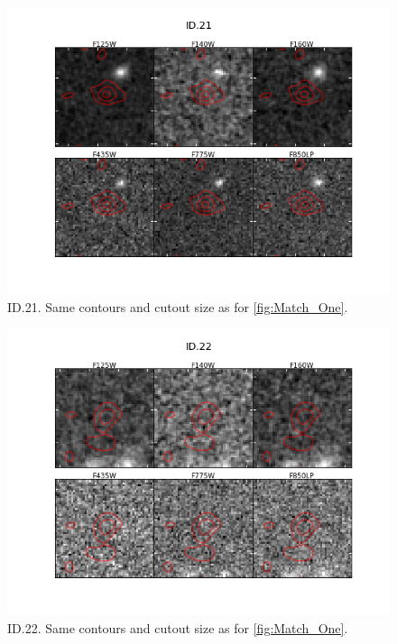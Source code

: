 \begin{figure}[tbp]
\centering \includegraphics[width=160mm]{Matched/ASPECS_Cutout_20.png}
\caption{ID.21. Same contours and cutout size as for \ref{fig:Match_One}.}
\label{fig:Match_Three}
\end{figure}

\begin{figure}[tbp]
\centering \includegraphics[width=160mm]{Matched/ASPECS_Cutout_21.png}
\caption{ID.22. Same contours and cutout size as for \ref{fig:Match_One}.}
\label{fig:Match_Three}
\end{figure}


